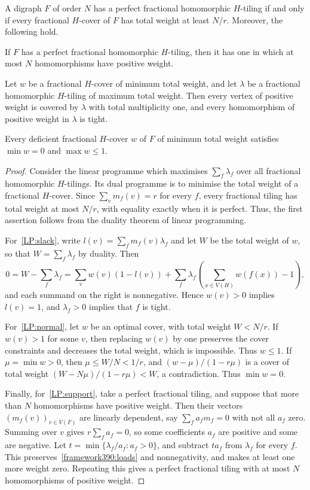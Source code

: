 \begin{lemma}\label{general:LP}
A digraph $F$ of order $N$ has a perfect fractional homomorphic
$H$-tiling if and only if every fractional $H$-cover of $F$ has total weight
at least $N/r$. Moreover, the following hold.
\begin{props}
\item If $F$ has a perfect fractional homomorphic $H$-tiling, then it has one in which at most $N$ homomorphisms have positive weight.\label{LP:support}
\item Let $w$ be a fractional $H$-cover of minimum total weight, and let $\lambda$ be a fractional homomorphic $H$-tiling of maximum total weight. Then every vertex of positive weight is covered by $\lambda$ with total multiplicity one, and every homomorphism of positive weight in $\lambda$ is tight.\label{LP:slack}
\item Every deficient fractional $H$-cover $w$ of $F$ of minimum total weight satisfies $\min w=0$ and $\max w\le1$.\label{LP:normal}
\end{props}
\end{lemma}
\begin{proof}
Consider the linear programme which maximises $\sum_f\lambda_f$ over all fractional homomorphic $H$-tilings. Its dual programme is to minimise the total weight of a fractional $H$-cover.
Since $\sum_vm_f(v)=r$ for every $f$, every fractional tiling has total weight at most $N/r$, with equality
exactly when it is perfect. Thus, the first assertion follows from the duality theorem of linear programming.

For~\ref{LP:slack}, write $l(v)=\sum_fm_f(v)\lambda_f$ and let $W$ be the total weight of $w$, so that $W=\sum_f\lambda_f$ by duality. Then
\[
 0=W-\sum_f\lambda_f
 =\sum_vw(v)(1-l(v))+
   \sum_f\lambda_f\left(\sum_{x\in V(H)}w(f(x))-1\right),
\]
and each summand on the right is nonnegative. Hence $w(v)>0$ implies $l(v)=1$, and
$\lambda_f>0$ implies that $f$ is tight.

For~\ref{LP:normal}, let $w$ be an optimal cover, with total weight $W<N/r$. If $w(v)>1$ for some $v$, then replacing $w(v)$ by one preserves the cover constraints and decreases the total weight, which is impossible. Thus $w\le1$.
If $\mu=\min w>0$, then $\mu\le W/N<1/r$, and
$(w-\mu)/(1-r\mu)$ is a cover of total weight
$(W-N\mu)/(1-r\mu)<W$, a contradiction. Thus $\min w=0$.

Finally, for~\ref{LP:support}, take a perfect fractional tiling, and suppose that more than $N$ homomorphisms have positive weight. Then their vectors $(m_f(v))_{v\in V(F)}$ are linearly dependent, say $\sum_fa_fm_f=0$ with not all $a_f$ zero. Summing over $v$ gives $r\sum_fa_f=0$, so some coefficients $a_f$ are positive and some are negative.
Let $t=\min\{\lambda_f/a_f:a_f>0\}$, and subtract $ta_f$ from $\lambda_f$ for every $f$. This preserves~\eqref{framework390:loads} and nonnegativity, and makes at least one more weight zero. Repeating this gives a perfect fractional tiling with at most $N$ homomorphisms of positive weight.
\end{proof}

